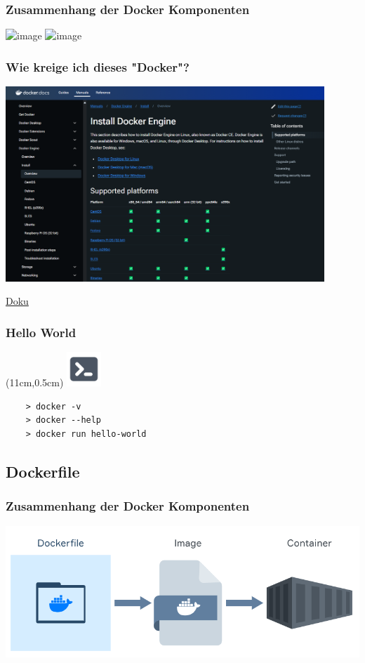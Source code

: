 \documentclass[22pt]{beamer}
\newcommand{\terminal}{
    \begin{textblock*}{1.3cm}(11cm,0.5cm) %
    \includegraphics[width=1.3cm]{Bilder/terminal.png}
    \end{textblock*}
}
\begin{document}
\begin{frame}[c]
    \frametitle{Zusammenhang der Docker Komponenten}
        \includegraphics<1>[width=1\textwidth]{Bilder/Docker-Ablauf.png}
        \includegraphics<2>[width=1\textwidth]{Bilder/dockercommand.png}
\end{frame}

\begin{frame}[t]
    \frametitle{Wie kreige ich dieses "Docker"?}
    \includegraphics[width=0.9\textwidth]{Bilder/Installation.png}

    \href{https://docs.docker.com/engine/install}{Doku}
\end{frame}

\begin{frame}[fragile]
    \frametitle{Hello World}
    \terminal
    \begin{verbatim}
    > docker -v
    > docker --help
    > docker run hello-world
    \end{verbatim}
\end{frame}

\subsection{Dockerfile}
\begin{frame}[c]
    \frametitle{Zusammenhang der Docker Komponenten}
    \includegraphics[width=1\textwidth]{Bilder/Docker-Ablauf_dark.png}
\end{frame}
\end{document}
